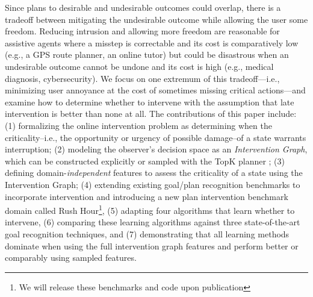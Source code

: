 \documentclass[letterpaper]{article}
\newenvironment{dashlist}{
 \begin{list}{-}
  {\setlength{\itemsep}{0pt}
   \setlength{\parsep}{0pt}
   \setlength{\topsep}{0pt}
   \setlength{\partopsep}{1pt}
   \setlength{\leftmargin}{1.5em}
   \setlength{\labelwidth}{2em}
   \setlength{\labelsep}{0.6em}}}
  {\end{list}}
\theoremstyle{plain}
\begin{document}
Since plans to desirable and undesirable outcomes could overlap, there is a tradeoff between mitigating the undesirable outcome while allowing the user some freedom.  
Reducing intrusion and allowing more freedom are reasonable for assistive agents where a misstep is correctable and its cost is comparatively low (e.g., a GPS route planner, an online tutor) but could be disastrous when an undesirable outcome cannot be undone and its cost is high (e.g., medical diagnosis, cybersecurity).  
We focus on one extremum of this tradeoff---i.e., minimizing user annoyance at the cost of sometimes missing critical actions---and examine how to determine whether to intervene with the assumption that late intervention is better than none at all.
The contributions of this paper include:
(1) formalizing the online intervention problem as determining when the criticality--i.e., the opportunity or urgency of possible damage--of a state warrants interruption; 
(2) modeling the observer's decision space as an \emph{Intervention Graph}, which can be constructed explicitly or sampled with the TopK planner \cite{riabov2014};
(3) defining domain-\emph{independent} features to assess the criticality of a state using the Intervention Graph;
(4) extending existing goal/plan recognition benchmarks \cite{ramirez2009plan,ramirez2010probabilistic} to incorporate intervention and introducing a new plan intervention benchmark domain called Rush Hour\footnote{We will release these benchmarks and code upon publication}, 
(5) adapting four algorithms that learn whether to intervene, 
(6) comparing these learning algorithms against three state-of-the-art goal recognition techniques, and
(7) demonstrating that all learning methods dominate when using the full intervention graph features and perform better or comparably using sampled features.
\end{document}
